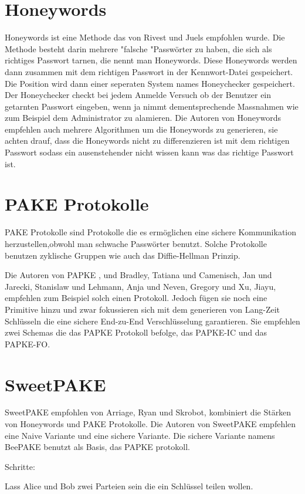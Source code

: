 \documentclass[conference, compsoc]{IEEEtran}
\begin{document}
\section{Honeywords}
Honeywords ist eine Methode das von Rivest und Juels empfohlen
wurde\cite{juels2013honeywords}. Die Methode besteht darin mehrere "falsche
"Passwörter zu haben, die sich als richtiges Passwort tarnen, die nennt man
Honeywords. Diese Honeywords werden dann zusammen mit dem richtigen Passwort in
der Kennwort-Datei gespeichert. Die Position wird dann einer seperaten System
names Honeychecker gespeichert. Der Honeychecker checkt bei jedem Anmelde
Versuch ob der Benutzer ein getarnten Passwort eingeben, wenn ja nimmt
dementsprechende Massnahmen wie zum Beispiel dem Administrator zu alamieren. 
Die Autoren von Honeywords empfehlen auch mehrere Algorithmen um die Honeywords
zu generieren, sie achten drauf, dass die Honeywords nicht zu differenzieren ist
mit dem richtigen Passwort sodass ein ausenstehender nicht wissen kann was das
richtige Passwort ist.

\section{PAKE Protokolle}
PAKE Protokolle sind Protokolle die es ermöglichen eine sichere Kommunikation
herzustellen,obwohl man schwache Passwörter benutzt. Solche Protokolle benutzen
zyklische Gruppen wie auch das Diffie-Hellman Prinzip.

Die Autoren von PAPKE \cite{bradley2019passwords}, und Bradley, Tatiana und
Camenisch, Jan und Jarecki, Stanislaw und Lehmann, Anja und Neven, Gregory und
Xu, Jiayu, empfehlen zum Beispiel solch einen Protokoll. Jedoch fügen sie noch
eine Primitive hinzu und zwar fokussieren sich mit dem generieren von Lang-Zeit
Schlüsseln die eine sichere End-zu-End Verschlüsselung garantieren. Sie
empfehlen zwei Schemas die das PAPKE Protokoll befolge, das PAPKE-IC und das
PAPKE-FO.

\section{SweetPAKE}
SweetPAKE empfohlen von Arriage, Ryan und Skrobot, kombiniert die Stärken
von Honeywords und PAKE Protokolle. Die Autoren von SweetPAKE empfehlen
eine Naive Variante und eine sichere Variante. Die sichere Variante namens 
BeePAKE benutzt als Basis, das PAPKE protokoll.

Schritte:

Lass Alice und Bob zwei Parteien sein die ein Schlüssel teilen wollen.
\end{document}
